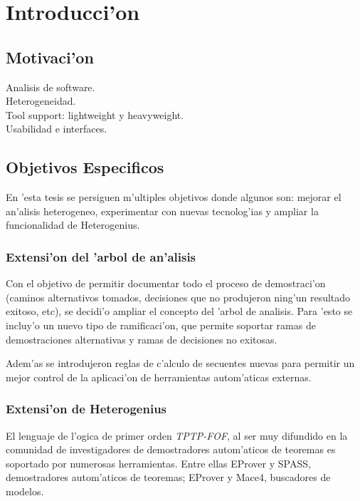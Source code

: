 \chapter{Introducci'on}
\section{Motivaci'on}



Analisis de software. \\
Heterogeneidad. \\
Tool support: lightweight y heavyweight. \\
Usabilidad e interfaces. \\

\section{Objetivos Especificos}

En 'esta tesis se persiguen m'ultiples objetivos donde algunos son: mejorar el an'alisis heterogeneo, experimentar con nuevas tecnolog'ias y ampliar la funcionalidad de Heterogenius.


\subsection{Extensi'on del 'arbol de an'alisis}

Con el objetivo de permitir documentar todo el proceso de demostraci'on (caminos alternativos tomados, decisiones que no produjeron ning'un resultado exitoso, etc), se decidi'o ampliar el concepto del 'arbol de analisis. Para 'esto se incluy'o un nuevo tipo de ramificaci'on, que permite soportar ramas de demostraciones alternativas y ramas de decisiones no exitosas.

Adem'as se introdujeron reglas de c'alculo de secuentes nuevas para permitir un mejor control de la aplicaci'on de herramientas autom'aticas externas.


\subsection{Extensi'on de Heterogenius}

El lenguaje de l'ogica de primer orden \textit{TPTP-FOF}, al ser muy difundido en la comunidad de investigadores de demostradores autom'aticos de teoremas es soportado por numerosas herramientas. Entre ellas EProver y SPASS, demostradores autom'aticos de teoremas; EProver y Mace4, buscadores de modelos. 

